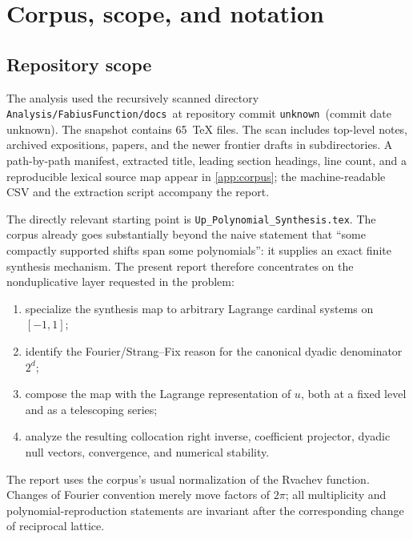 \documentclass[11pt,oneside]{book}
\newcommand{\CorpusCount}{65}%
\newcommand{\RepoCommit}{\texttt{unknown}}%
\newcommand{\RepoCommitDate}{unknown}%
\newcommand{\CorpusRoot}{\texttt{Analysis/FabiusFunction/docs}}%
\theoremstyle{definition}
\theoremstyle{remark}
\newcommand{\RepoPath}[1]{\texttt{#1}}
\begin{document}
\mainmatter

\chapter{Corpus, scope, and notation}
\label{ch:corpus}

\section{Repository scope}
The analysis used the recursively scanned directory \CorpusRoot\ at repository commit \RepoCommit\ (commit date \RepoCommitDate).  The snapshot contains \CorpusCount\ TeX files.  The scan includes top-level notes, archived expositions, papers, and the newer frontier drafts in subdirectories.  A path-by-path manifest, extracted title, leading section headings, line count, and a reproducible lexical source map appear in \cref{app:corpus}; the machine-readable CSV and the extraction script accompany the report.

The directly relevant starting point is \RepoPath{Up\_Polynomial\_Synthesis.tex}.  The corpus already goes substantially beyond the naive statement that ``some compactly supported shifts span some polynomials'': it supplies an exact finite synthesis mechanism.  The present report therefore concentrates on the nonduplicative layer requested in the problem:
\begin{enumerate}
  \item specialize the synthesis map to arbitrary Lagrange cardinal systems on \([-1,1]\);
  \item identify the Fourier/Strang--Fix reason for the canonical dyadic denominator \(2^d\);
  \item compose the map with the Lagrange representation of \(u\), both at a fixed level and as a telescoping series;
  \item analyze the resulting collocation right inverse, coefficient projector, dyadic null vectors, convergence, and numerical stability.
\end{enumerate}

The report uses the corpus's usual normalization of the Rvachev function.  Changes of Fourier convention merely move factors of \(2\pi\); all multiplicity and polynomial-reproduction statements are invariant after the corresponding change of reciprocal lattice.

\end{document}
